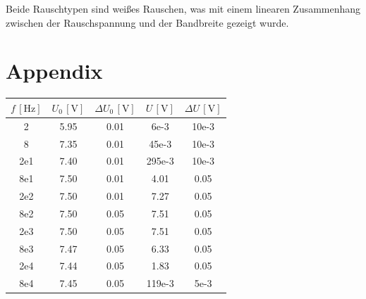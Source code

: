 \documentclass[sn-mathphys-num,iicol]{sn-jnl}
\theoremstyle{thmstyleone}
\theoremstyle{thmstyletwo}
\theoremstyle{thmstylethree}
\begin{document}
Beide Rauschtypen sind weißes Rauschen, was mit einem linearen Zusammenhang zwischen der Rauschspannung und der Bandbreite gezeigt wurde.

\clearpage
\section{Appendix}
\begin{table}[h]
	\begin{tabular}{S[table-format=1.2e1] S[table-format=1.2] S[table-format=1.2] S[table-format=1.2e1] S[table-format=1.2e1]}
		\toprule
		{\(f\,[\si{\hertz}]\)} & {\(U_0\,[\si{\volt}]\)} & {\(\Delta U_0\,[\si{\volt}]\)} & {\(U\,[\si{\volt}]\)} & {\(\Delta U\,[\si{\volt}]\)} \\
		                      & 5.95                    & 0.01                           & 6e-3                  & 10e-3                        \\
		8                      & 7.35                    & 0.01                           & 45e-3                 & 10e-3                        \\
		2e1                    & 7.40                    & 0.01                           & 295e-3                & 10e-3                        \\
		8e1                    & 7.50                    & 0.01                           & 4.01                  & 0.05                         \\
		2e2                    & 7.50                    & 0.01                           & 7.27                  & 0.05                         \\
		8e2                    & 7.50                    & 0.05                           & 7.51                  & 0.05                         \\
		2e3                    & 7.50                    & 0.05                           & 7.51                  & 0.05                         \\
		8e3                    & 7.47                    & 0.05                           & 6.33                  & 0.05                         \\
		2e4                    & 7.44                    & 0.05                           & 1.83                  & 0.05                         \\
		8e4                    & 7.45                    & 0.05                           & 119e-3                & 5e-3                         \\

\end{tabular}
\end{table}
\end{document}
